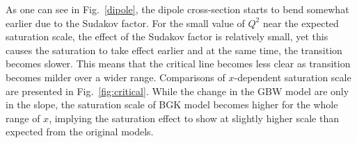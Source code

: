 \documentclass[11pt]{article}
\begin{document}
As one can see in Fig.~\ref{dipole}, the dipole cross-section starts to bend somewhat earlier due to the Sudakov factor. For the small value of $Q^2$ near the expected saturation scale, the effect of the Sudakov factor is relatively small, yet this causes the saturation to take effect earlier and at the same time, the transition becomes slower. This means that the critical line becomes less clear as transition becomes milder over a wider range. %
Comparisons of $x$-dependent saturation scale are presented in Fig.~\ref{fig:critical}. While the change in the GBW model  are only in the slope, the saturation scale of  BGK model becomes higher for the whole range of $x$, implying the saturation effect to show at slightly higher scale than expected from the original models.

\end{document}
